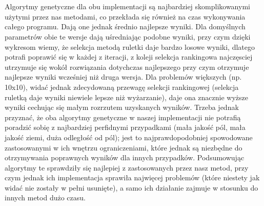 \documentclass{article}
\begin{document}
\\\\Algorytmy genetyczne dla obu implementacji są najbardziej skomplikowanymi użytymi przez nas metodami, co przekłada się również na czas wykonywania całego programu. Dają one jednak średnio najlepsze wyniki. Dla domyślnych parametrów obie te wersje dają uśredniając podobne wyniki, przy czym dzięki wykresom wiemy, że selekcja metodą ruletki daje bardzo losowe wyniki, dlatego potrafi poprawić się w każdej z iteracji, z koleji selekcja rankingowa najczęsciej utrzymuje się wokół rozwiązania dotychczas najlepszego przy czym otrzymuje najlepsze wyniki wcześniej niż druga wersja. Dla problemów większych (np. 10x10), widać jednak zdecydowaną przewagę selekcji rankingowej (selekcja ruletką daje wyniki niewiele lepsze niż wyżarzanie), daje ona znacznie wyższe wyniki cechując się małym rozrzutem uzyskanych wyników. Trzeba jednak przyznać, że oba algorytmy genetyczne w naszej implementacji nie potrafią poradzić sobię z najbardziej perfidnymi przypadkami (mała jakość pól, mała jakość ziemi, duża odległość od pól); jest to najprawdopodobniej spowodowane zastosowanymi w ich wnętrzu ograniczeniami, które jednak są niezbędne do otrzymywania poprawnych wyników dla innych przypadków. Podsumowując algorytmy te sprawdziły się najlepiej z zastosowanych przez nasz metod, przy czym jednak ich implementacja sprawiła najwięcej problemów (które niestety jak widać nie zostały w pełni usunięte), a samo ich działanie zajmuje w stosunku do innych metod dużo czasu.
\end{document}
